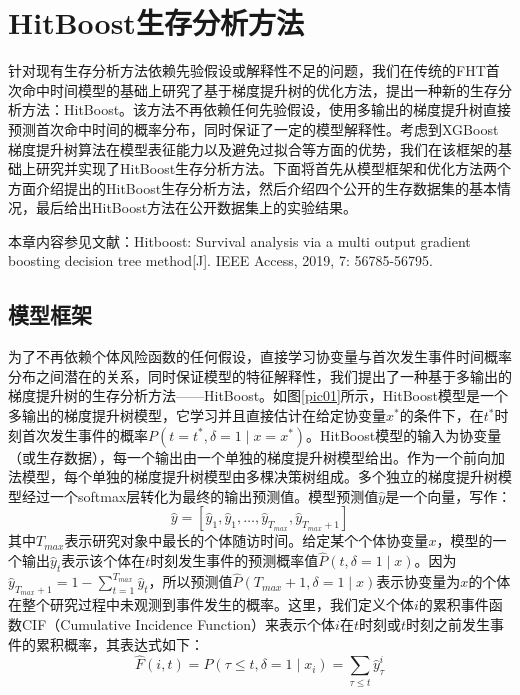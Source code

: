 
\chapter{HitBoost生存分析方法}

针对现有生存分析方法依赖先验假设或解释性不足的问题，我们在传统的FHT首次命中时间模型的基础上研究了基于梯度提升树的优化方法，提出一种新的生存分析方法：HitBoost。该方法不再依赖任何先验假设，使用多输出的梯度提升树直接预测首次命中时间的概率分布，同时保证了一定的模型解释性。考虑到XGBoost梯度提升树算法在模型表征能力以及避免过拟合等方面的优势，我们在该框架的基础上研究并实现了HitBoost生存分析方法。下面将首先从模型框架和优化方法两个方面介绍提出的HitBoost生存分析方法，然后介绍四个公开的生存数据集的基本情况，最后给出HitBoost方法在公开数据集上的实验结果。

本章内容参见文献：Hitboost: Survival analysis via a multi­ output gradient boosting decision tree method[J]. IEEE Access, 2019, 7: 56785-­56795.

\section{模型框架}

为了不再依赖个体风险函数的任何假设，直接学习协变量与首次发生事件时间概率分布之间潜在的关系，同时保证模型的特征解释性，我们提出了一种基于多输出的梯度提升树的生存分析方法——HitBoost。如图\ref{pic01}所示，HitBoost模型是一个多输出的梯度提升树模型，它学习并且直接估计在给定协变量$x^*$的条件下，在$t^*$时刻首次发生事件的概率$P(t = t^*,\delta = 1\mid x = x^* )$。HitBoost模型的输入为协变量（或生存数据），每一个输出由一个单独的梯度提升树模型给出。作为一个前向加法模型，每个单独的梯度提升树模型由多棵决策树组成。多个独立的梯度提升树模型经过一个softmax层转化为最终的输出预测值。模型预测值$\hat{y}$是一个向量，写作：
\begin{equation}
\hat{y}=\left[\hat{y}_1, \hat{y}_1, \dots, \hat{y}_{T_{max}}, \hat{y}_{T_{max}+1}\right] \label{F31}
\end{equation}
其中$T_{max}$表示研究对象中最长的个体随访时间。给定某个个体协变量$x$，模型的一个输出$\hat{y}_t$表示该个体在$t$时刻发生事件的预测概率值$\hat{P}(t, \delta = 1 \mid x)$。因为$\hat{y}_{T_{max}+1}=1-\sum_{t=1}^{T_{max}} \hat{y}_t$，所以预测值$\hat{P}(T_{max}+1, \delta = 1 \mid x)$表示协变量为$x$的个体在整个研究过程中未观测到事件发生的概率。这里，我们定义个体$i$的累积事件函数CIF（Cumulative Incidence Function）来表示个体$i$在$t$时刻或$t$时刻之前发生事件的累积概率，其表达式如下：
\begin{equation}
\hat{F}(i, t) = P(\tau \le t, \delta = 1 \mid x_i) = \sum_{\tau \le t} \hat{y}_{\tau}^i \label{F32}
\end{equation}

